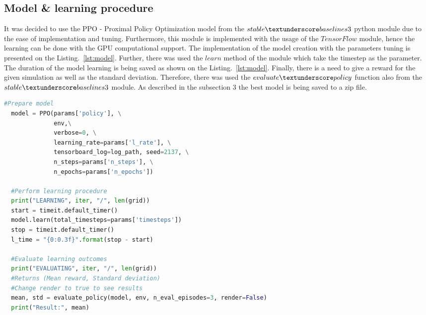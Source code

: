 \documentclass[runningheads]{llncs}
\begin{document}
\subsection{Model \& learning procedure}
It was decided to use the PPO - Proximal Policy Optimization model from the $stable\textunderscore baselines3$ python module due to the ease of implementation and tuning. Furthermore, this module is implemented with the usage of the $TensorFlow$ module, hence the learning can be done with the GPU computational support. The implementation of the model creation with the parameters tuning is presented on the Listing.~\ref{lst:model}. Further, there was used the $learn$ method of the module which take the timestep as the parameter. The duration of the model learning is being saved as shown on the Listing.~\ref{lst:model}. Finally, there is a need to give a reward for the given simulation as well as the standard deviation. Therefore, there was used the $evaluate\textunderscore policy$ function also from the $stable\textunderscore baselines3$ module. As described in the subsection 3 the best model is being saved to a zip file.
\begin{lstlisting}[caption={Model creation}, language=Python, label={lst:model}]
  #Prepare model
  model = PPO(params['policy'], \
              env,\
              verbose=0, \
              learning_rate=params['l_rate'], \
              tensorboard_log=log_path, seed=2137, \
              n_steps=params['n_steps'], \
              n_epochs=params['n_epochs'])

  #Perform learning procedure
  print("LEARNING", iter, "/", len(grid))
  start = timeit.default_timer()
  model.learn(total_timesteps=params['timesteps'])
  stop = timeit.default_timer()
  l_time = "{0:0.3f}".format(stop - start)

  #Evaluate learning outcomes
  print("EVALUATING", iter, "/", len(grid))
  #Returns (Mean reward, Standard deviation)
  #Change render to true to see results
  mean, std = evaluate_policy(model, env, n_eval_episodes=3, render=False)
  print("Result:", mean)
\end{lstlisting}
\end{document}
